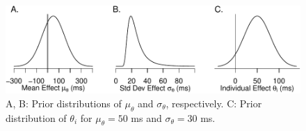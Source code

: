 \documentclass[
  english,
  ,man]{apa6}
\begin{document}
\begin{figure}
\centering
\includegraphics{p_files/figure-latex/theta-1.pdf}
\caption{\label{fig:theta}A, B: Prior distributions of \(\mu_\theta\) and \(\sigma_\theta\), respectively. C: Prior distribution of \(\theta_i\) for \(\mu_\theta=50\) ms and \(\sigma_\theta=30\) ms.}
\end{figure}

\begin{table}[tbp]

\begin{center}
\begin{threeparttable}

\caption{\label{tab:metaTab}}


\end{threeparttable}
\end{center}
\end{table}
\end{document}
